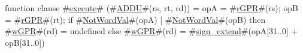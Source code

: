 function clause #\hyperref[zexecute]{execute}# (#\hyperref[zADDU]{ADDU}#(rs, rt, rd)) =
  {
    opA = #\hyperref[zrGPR]{rGPR}#(rs);
    opB = #\hyperref[zrGPR]{rGPR}#(rt);
    if #\hyperref[zNotWordVal]{NotWordVal}#(opA) | #\hyperref[zNotWordVal]{NotWordVal}#(opB) then
      #\hyperref[zwGPR]{wGPR}#(rd) = undefined
    else
      #\hyperref[zwGPR]{wGPR}#(rd) = #\hyperref[zsignzyextend]{sign\_extend}#(opA[31..0] + opB[31..0])
  }
